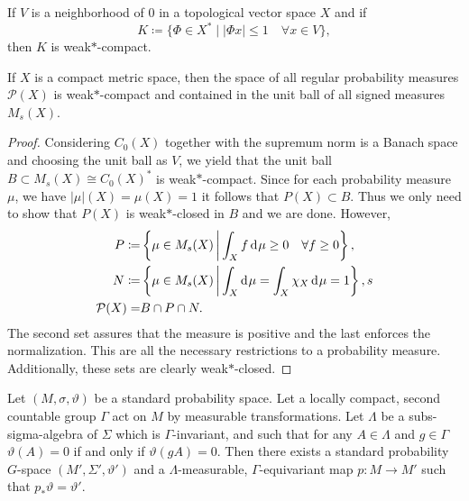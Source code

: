 \begin{thm}
  If \(V\) is a neighborhood of 0 in a topological vector space \(X\) and if
  \[
    K \coloneqq \{ \Phi \in X^\ast \mid |\Phi x| \leq 1 \quad \forall x \in V\},
  \]
  then \(K\) is weak\(\ast\)-compact.
\end{thm}

\begin{cor}
  \label{cor:banach-alaoglu}
  If \(X\) is a compact metric space, then the space of all regular probability measures \(\mathcal{P}(X)\) is weak\(\ast\)-compact and contained in the unit ball of all signed measures \(M_{s}(X)\).
\end{cor}

\begin{proof}
  Considering \(C_0(X)\) together with the supremum norm is a Banach space and choosing the unit ball as \(V\), we yield that the unit ball \(B \subset M_s(X) \cong C_0(X)^\ast\) is weak\(\ast\)-compact. Since for each probability measure \(\mu\), we have \(|\mu|(X) = \mu(X) = 1\) it follows that \(P(X) \subset B\). Thus we only need to show that \(P(X)\) is weak\(\ast\)-closed in \(B\) and we are done. However,
  \begin{align*}
    P \coloneqq & \left\{\mu \in M_s(X) \relmid \int_X f \d\mu \geq 0 \quad \forall f \geq 0\right\},\\
    N \coloneqq & \left\{\mu \in M_s(X) \relmid \int_X \d\mu = \int_X \chi_X \d\mu = 1\right\},s\\
    \mathcal{P}(X)  = & B \cap P \cap N.
  \end{align*}
  The second set assures that the measure is positive and the last enforces the normalization. This are all the necessary restrictions to a probability measure. Additionally, these sets are clearly weak\(\ast\)-closed.
\end{proof}

\begin{thm}
  \label{thm:mackey}
  Let \((M, \sigma, \vartheta)\) be a standard probability space. Let a locally compact, second countable group \(\Gamma\) act on \(M\) by measurable transformations. Let \(\Lambda\) be a subs-sigma-algebra of \(\Sigma\) which is \(\Gamma\)-invariant, and such that for any \(A \in \Lambda\) and \(g \in \Gamma\) \(\vartheta(A) = 0 \) if and only if \(\vartheta(gA) = 0\). Then there exists a standard probability \(G\)-space \((M', \Sigma', \vartheta')\) and a \(\Lambda\)-measurable, \(\Gamma\)-equivariant map \(p \colon M \to M'\) such that \(p_\ast \vartheta = \vartheta'\).
\end{thm}


